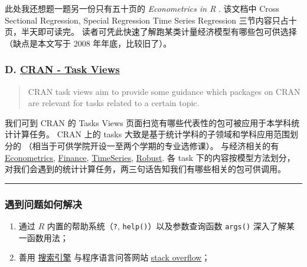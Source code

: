 \documentclass[11pt,hyperref]{ctexart}
\begin{document}
此处我还想题一题另一份只有五十页的 \emph{Econometrics in R} . 该文档中
Cross Sectional Regression, Special Regression Time Series Regression
三节内容只占十页，半天即可读完。
读者可凭此快速了解跑某类计量经济模型有哪些包可供选择（缺点是本文写于
2008 年年底，比较旧了）。

\hypertarget{d.-cran---task-views}{%
\subsubsection{\texorpdfstring{D.
\href{https://mirrors.tuna.tsinghua.edu.cn/CRAN/web/views/}{CRAN - Task
Views}}{D. CRAN - Task Views}}\label{d.-cran---task-views}}

\begin{quote}
CRAN task views aim to provide some guidance which packages on CRAN are
relevant for tasks related to a certain topic.
\end{quote}

我们可到 CRAN 的 Tasks Views
页面扫览有哪些代表性的包可被应用于本学科统计计算任务。 CRAN 上的 tasks
大致是基于统计学科的子领域和学科应用范围划分的
（相当于可供学院开设一至两个学期的专业选修课）。 与经济相关的有
\href{https://mirrors.tuna.tsinghua.edu.cn/CRAN/web/views/Econometrics.html}{Econometrics},
\href{https://mirrors.tuna.tsinghua.edu.cn/CRAN/web/views/Finance.html}{Finance},
\href{https://mirrors.tuna.tsinghua.edu.cn/CRAN/web/views/TimeSeries.html}{TimeSeries},
\href{https://mirrors.tuna.tsinghua.edu.cn/CRAN/web/views/Robust.html}{Robust}.
各 task 下的内容按模型方法划分，
对我们会遇到的统计计算任务，两三句话告知我们有哪些相关的包可供调用。

\begin{center}\rule{0.5\linewidth}{0.5pt}\end{center}

\hypertarget{ux9047ux5230ux95eeux9898ux5982ux4f55ux89e3ux51b3}{%
\subsubsection{遇到问题如何解决}\label{ux9047ux5230ux95eeux9898ux5982ux4f55ux89e3ux51b3}}

\begin{enumerate}
\def\labelenumi{\arabic{enumi}.}
\item
  通过 \(R\) 内置的帮助系统（\texttt{?},
  \texttt{help()}）以及参数查询函数 \texttt{args()}
  深入了解某一函数用法；
\item
  善用 \href{https://www.google.com/}{搜索引擎} 与程序语言问答网站
  \href{https://stackoverflow.com/questions/tagged/r}{stack overflow}；
\end{enumerate}
\end{document}
